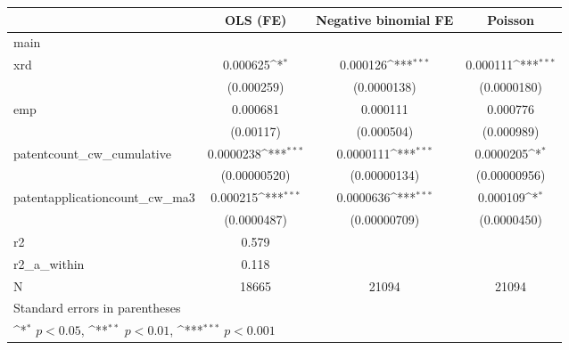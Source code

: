 {
\def\sym#1{\ifmmode^{#1}\else\(^{#1}\)\fi}
\begin{tabular}{l*{3}{c}}
\hline\hline
            &\multicolumn{1}{c}{OLS (FE)}&\multicolumn{1}{c}{Negative binomial FE}&\multicolumn{1}{c}{Poisson}\\
\hline
main        &                     &                     &                     \\
xrd         &    0.000625\sym{*}  &    0.000126\sym{***}&    0.000111\sym{***}\\
            &  (0.000259)         & (0.0000138)         & (0.0000180)         \\
[1em]
emp         &    0.000681         &    0.000111         &    0.000776         \\
            &   (0.00117)         &  (0.000504)         &  (0.000989)         \\
[1em]
patentcount\_cw\_cumulative&   0.0000238\sym{***}&   0.0000111\sym{***}&   0.0000205\sym{*}  \\
            &(0.00000520)         &(0.00000134)         &(0.00000956)         \\
[1em]
patentapplicationcount\_cw\_ma3&    0.000215\sym{***}&   0.0000636\sym{***}&    0.000109\sym{*}  \\
            & (0.0000487)         &(0.00000709)         & (0.0000450)         \\
\hline
r2          &       0.579         &                     &                     \\
r2\_a\_within &       0.118         &                     &                     \\
N           &       18665         &       21094         &       21094         \\
\hline\hline
\multicolumn{4}{l}{\footnotesize Standard errors in parentheses}\\
\multicolumn{4}{l}{\footnotesize \sym{*} \(p<0.05\), \sym{**} \(p<0.01\), \sym{***} \(p<0.001\)}\\
\end{tabular}
}
